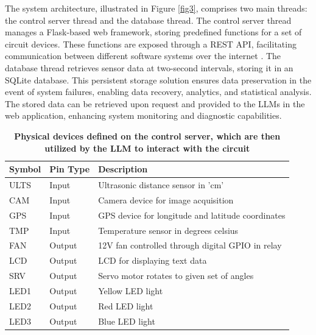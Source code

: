 \documentclass{ieeeaccess}
\begin{document}
The system architecture, illustrated in Figure  \ref{fig3}, comprises two main threads: the control server thread and the database thread. The control server thread manages a Flask-based web framework, storing predefined functions for a set of circuit devices. These functions are exposed through a REST API, facilitating communication between different software systems over the internet \cite{Surwase2016RESTAM}. The database thread retrieves sensor data at two-second intervals, storing it in an SQLite database. This persistent storage solution ensures data preservation in the event of system failures, enabling data recovery, analytics, and statistical analysis. The stored data can be retrieved upon request and provided to the LLMs in the web application, enhancing system monitoring and diagnostic capabilities.

\begin{table}[!h]
    \caption{\textbf{Physical devices defined on the control server, which are then utilized by the LLM to interact with the circuit}}
    \label{table1}
    \setlength{\tabcolsep}{3pt}
    \begin{tabular}{|p{30pt}|p{32pt}|p{165pt}|}
        \hline
        \textbf{Symbol} &
        \textbf{Pin Type}   &
        \textbf{Description}                                             \\
        \hline
        ULTS   &
        Input  &
        Ultrasonic distance sensor in 'cm'                      \\
        \hline
        CAM    &
        Input  &
        Camera device for image acquisition                       \\
        \hline
        GPS    &
        Input  &
        GPS device for longitude and latitude coordinates       \\
        \hline
        TMP    &
        Input  &
        Temperature sensor in degrees celsius    \\
        \hline
        FAN    &
        Output &
        12V fan controlled through digital GPIO in relay \\
        \hline
        LCD    &
        Output &
        LCD for displaying text data                          \\
        \hline
        SRV    &
        Output &
        Servo motor rotates to given set of angles         \\
        \hline
        LED1   &
        Output &
        Yellow LED light                                        \\
        \hline
        LED2   &
        Output &
        Red LED light                                           \\
        \hline
        LED3   &
        Output &
        Blue LED light                                          \\
        \hline
    \end{tabular}
\end{table}
\end{document}
